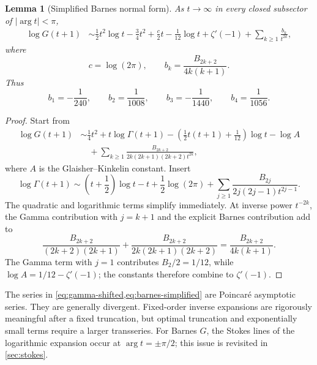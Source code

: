 \documentclass[11pt]{article}
\newtheorem{lemma}[theorem]{Lemma}
\theoremstyle{definition}
\theoremstyle{remark}
\begin{document}
\begin{lemma}[Simplified Barnes normal form]\label{lem:barnes-stirling}
As \(t\to\infty\) in every closed subsector of \(|\arg t|<\pi\),
\begin{equation}\label{eq:barnes-simplified}
\begin{split}
 \log G(t+1)
 &\sim \frac12t^2\log t-\frac34t^2
 +\frac{c}{2}t-\frac1{12}\log t+\zeta'(-1)
 +\sum_{k\ge1}\frac{b_k}{t^{2k}},
\end{split}
\end{equation}
where
\begin{equation}\label{eq:bk}
 c=\log(2\pi),\qquad
 b_k=\frac{B_{2k+2}}{4k(k+1)}.
\end{equation}
Thus
\[
 b_1=-\frac1{240},\qquad
 b_2=\frac1{1008},\qquad
 b_3=-\frac1{1440},\qquad
 b_4=\frac1{1056}.
\]
\end{lemma}

\begin{proof}
Start from
\[
\begin{split}
 \log G(t+1)
 &\sim \frac14t^2+t\log\Gamma(t+1)
 -\left(\frac12t(t+1)+\frac1{12}\right)\log t-\log A\\
 &\quad+\sum_{k\ge1}
 \frac{B_{2k+2}}{2k(2k+1)(2k+2)t^{2k}},
\end{split}
\]
where \(A\) is the Glaisher--Kinkelin constant.  Insert
\[
 \log\Gamma(t+1)
 \sim \left(t+\frac12\right)\log t-t+\frac12\log(2\pi)
 +\sum_{j\ge1}\frac{B_{2j}}{2j(2j-1)t^{2j-1}}.
\]
The quadratic and logarithmic terms simplify immediately.  At inverse power
\(t^{-2k}\), the Gamma contribution with \(j=k+1\) and the explicit Barnes contribution add to
\[
 \frac{B_{2k+2}}{(2k+2)(2k+1)}
 +\frac{B_{2k+2}}{2k(2k+1)(2k+2)}
 =\frac{B_{2k+2}}{4k(k+1)}.
\]
The Gamma term with \(j=1\) contributes \(B_2/2=1/12\), while
\(\log A=1/12-\zeta'(-1)\); the constants therefore combine to \(\zeta'(-1)\).
\end{proof}

\begin{warningbox}
The series in \cref{eq:gamma-shifted,eq:barnes-simplified} are Poincar\'e asymptotic series.  They are generally divergent.  Fixed-order inverse expansions are rigorously meaningful after a fixed truncation, but optimal truncation and exponentially small terms require a larger transseries.  For Barnes \(G\), the Stokes lines of the logarithmic expansion occur at \(\arg t=\pm\pi/2\); this issue is revisited in \cref{sec:stokes}.
\end{warningbox}
\end{document}
